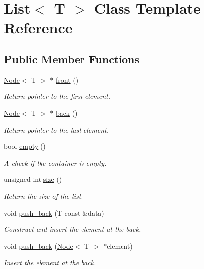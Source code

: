 \hypertarget{class_list}{}\section{List$<$ T $>$ Class Template Reference}
\label{class_list}
\subsection*{Public Member Functions}
\begin{DoxyCompactItemize}
\item 
\hyperlink{struct_node}{Node}$<$ T $>$ $\ast$ \hyperlink{class_list_a0ea52d2f31cba662a5121ba724a1afc6}{front} ()
\begin{DoxyCompactList}\small\item\em Return pointer to the first element. \end{DoxyCompactList}\item 
\hyperlink{struct_node}{Node}$<$ T $>$ $\ast$ \hyperlink{class_list_a0e0849a1ca10791cb2788ec41af14c26}{back} ()
\begin{DoxyCompactList}\small\item\em Return pointer to the last element. \end{DoxyCompactList}\item 
bool \hyperlink{class_list_a3737ca60365287ce663393d8c07d1a41}{empty} ()
\begin{DoxyCompactList}\small\item\em A check if the container is empty. \end{DoxyCompactList}\item 
unsigned int \hyperlink{class_list_ad908ab5cf19370fcdf61cf1927e5e8f5}{size} ()
\begin{DoxyCompactList}\small\item\em Return the size of the list. \end{DoxyCompactList}\item 
void \hyperlink{class_list_afc370c46b52217d24992076d66e78c2e}{push\+\_\+back} (T const \&data)
\begin{DoxyCompactList}\small\item\em Construct and insert the element at the back. \end{DoxyCompactList}\item 
void \hyperlink{class_list_a36d7022ab9a7fadeb45a5933e64e8bd8}{push\+\_\+back} (\hyperlink{struct_node}{Node}$<$ T $>$ $\ast$element)
\begin{DoxyCompactList}\small\item\em Insert the element at the back. \end{DoxyCompactList}\item 

\end{DoxyCompactItemize}
